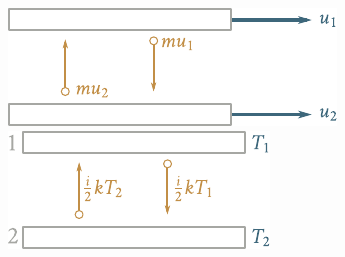 \begin{figure}[!htb]
	\begin{minipage}[t]{0.5\linewidth}
		\begin{center}
			\includegraphics[scale=1]{figures/ch_16/fig_16_10.pdf}
			\caption[]{}
			\label{fig:16_10}
		\end{center}
	\end{minipage}
	\hspace{-0.05cm}
	\begin{minipage}[t]{0.5\linewidth}
		\begin{center}
			\includegraphics[scale=1]{figures/ch_16/fig_16_11.pdf}
			\caption[]{}
			\label{fig:16_11}
		\end{center}
	\end{minipage}
\end{figure}

